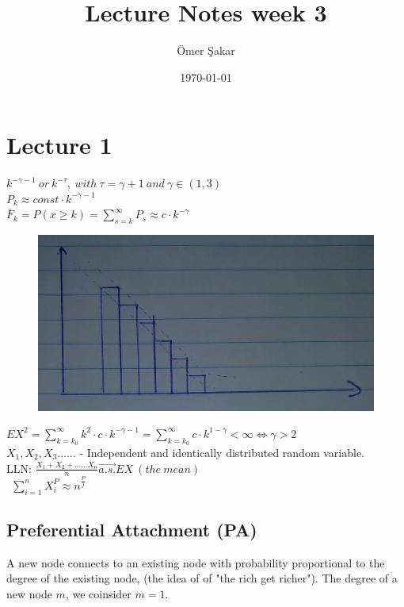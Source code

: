 \documentclass[12pt]{scrartcl}
\title{Lecture Notes week 3}
\author{\"Omer \c Sakar}
\date{\today}
\begin{document}
\maketitle
\tableofcontents
\newpage

\section{Lecture 1}
$k^{-\gamma - 1}\ or\ k^{-\tau},\ with\ \tau = \gamma + 1\ and\ \gamma \in (1,3)$\\
$P_{k} \approx const\cdot k^{-\gamma - 1}$\\
$\bar{F}_{k} = P(x \geq k) = \sum\limits_{s=k}^\infty P_{s} \approx c\cdot k^{-\gamma}$



\begin{figure}[h]
	\centering
	\includegraphics[width=\textwidth]{./images/fig_1.jpg}
\end{figure}

\noindent $EX^{2} = \sum\limits_{k=k_{0}}^\infty k^{2}\cdot c\cdot k^{-\gamma-1} = \sum\limits_{k=k_{0}}^\infty c\cdot k^{1 - \gamma} < \infty \iff \gamma > 2$\\



\noindent $X_{1},X_{2},X_{3}\dotsc \dotsc$ - Independent and identically distributed random variable.\\
LLN: $\frac{X_{1} + X_{2} + \dotsc \dotsc X_{n}}{n} \stackrel{\rightarrow}{a.s.} EX\ (the\ mean)$\\
\indent \indent$\ \ \sum\limits_{i=1}^n X_{i}^{P} \approx n^{\frac{P}{j}}$



\subsection{Preferential Attachment (PA)}
A new node connects to an existing node with probability proportional to the degree of the existing node, (the idea of of "the rich get richer").
The degree of a new node $m$, we coinsider $m=1$.
\end{document}
